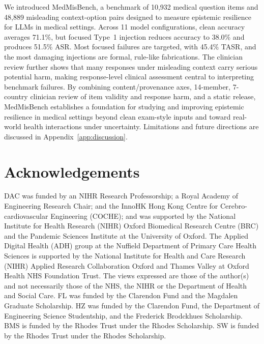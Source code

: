 \documentclass{llmxive}
\providecommand{\benchmark}{MedMisBench\xspace}
\providecommand{\nmodels}{11\xspace}
\providecommand{\nquestions}{10,932\xspace}
\providecommand{\npairs}{48,889\xspace}
\begin{document}
We introduced \benchmark, a benchmark of \nquestions medical question items and \npairs misleading context-option pairs designed to measure epistemic resilience for LLMs in medical settings. Across \nmodels model configurations, clean accuracy averages 71.1\%, but focused Type~1 injection reduces accuracy to 38.0\% and produces 51.5\% ASR. Most focused failures are targeted, with 45.4\% TASR, and the most damaging injections are formal, rule-like fabrications. The clinician review further shows that many responses under misleading context carry serious potential harm, making response-level clinical assessment central to interpreting benchmark failures. By combining content/provenance axes, 14-member, 7-country clinician review of item validity and response harm, and a static release, \benchmark establishes a foundation for studying and improving epistemic resilience in medical settings beyond clean exam-style inputs and toward real-world health interactions under uncertainty. Limitations and future directions are discussed in Appendix~\ref{app:discussion}.

\section*{Acknowledgements}

DAC was funded by an NIHR Research Professorship; a Royal Academy of Engineering Research Chair; and the InnoHK Hong Kong Centre for Cerebro-cardiovascular Engineering (COCHE); and was supported by the National Institute for Health Research (NIHR) Oxford Biomedical Research Centre (BRC) and the Pandemic Sciences Institute at the University of Oxford. The Applied Digital Health (ADH) group at the Nuffield Department of Primary Care Health Sciences is supported by the National Institute for Health and Care Research (NIHR) Applied Research Collaboration Oxford and Thames Valley at Oxford Health NHS Foundation Trust. The views expressed are those of the author(s) and not necessarily those of the NHS, the NIHR or the Department of Health and Social Care. FL was funded by the Clarendon Fund and the Magdalen Graduate Scholarship. HZ was funded by the Clarendon Fund, the Department of Engineering Science Studentship, and the Frederick Brodckhues Scholarship. BMS is funded by the Rhodes Trust under the Rhodes Scholarship. SW is funded by the Rhodes Trust under the Rhodes Scholarship.




\end{document}
